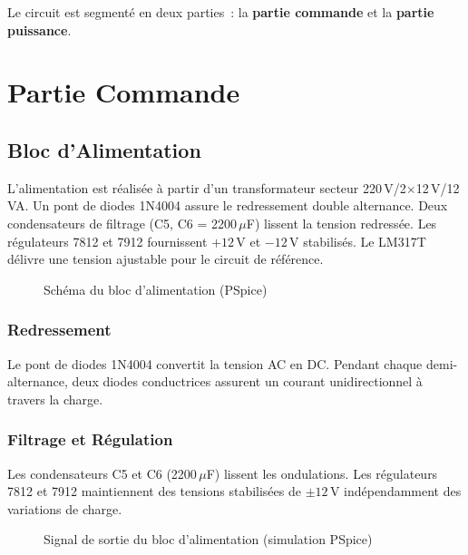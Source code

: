 \documentclass[a4paper,12pt,openany]{book}
\begin{document}
Le circuit est segment\'e en deux parties~: la \textbf{partie commande}
et la \textbf{partie puissance}.

\section{Partie Commande}

\subsection{Bloc d'Alimentation}

L'alimentation est r\'ealis\'ee \`a partir d'un transformateur secteur
220\,V/2$\times$12\,V/12\,VA. Un pont de diodes 1N4004 assure le
redressement double alternance. Deux condensateurs de filtrage
(C5, C6 = 2200\,$\mu$F) lissent la tension redress\'ee. Les r\'egulateurs
7812 et 7912 fournissent $+12$\,V et $-12$\,V stabilis\'es. Le LM317T
d\'elivre une tension ajustable pour le circuit de r\'ef\'erence.

\begin{figure}[H]
  \centering
  \caption{Sch\'ema du bloc d'alimentation (PSpice)}
  \label{fig:alim_schema}
\end{figure}

\subsubsection{Redressement}

Le pont de diodes 1N4004 convertit la tension AC en DC. Pendant chaque
demi-alternance, deux diodes conductrices assurent un courant
unidirectionnel \`a travers la charge.

\subsubsection{Filtrage et R\'egulation}

Les condensateurs C5 et C6 (2200\,$\mu$F) lissent les ondulations.
Les r\'egulateurs 7812 et 7912 maintiennent des tensions stabilis\'ees
de $\pm12$\,V ind\'ependamment des variations de charge.

\begin{figure}[H]
  \centering
  \caption{Signal de sortie du bloc d'alimentation (simulation PSpice)}
  \label{fig:alim_signal}
\end{figure}
\end{document}
